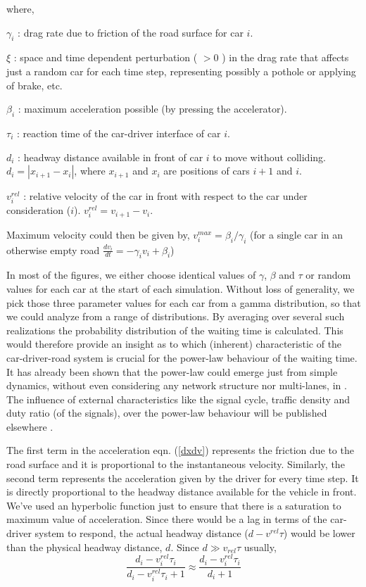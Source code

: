 \documentclass[conference]{IEEEtran}
\begin{document}
where,


$\gamma_{i}$ : drag rate due to friction of the road surface for car $i$.

$\xi$ : space and time dependent perturbation ( $>0$ ) in the drag rate that affects just a random car for each time step, representing possibly a pothole or applying of brake, etc.

$\beta_{i}$ : maximum acceleration possible (by pressing %
the accelerator).

$\tau_{i}$ : reaction time of the car-driver interface of car $i$.

$d_{i}$ : headway distance available in front of car $i$ to move without colliding. $d_{i}=|x_{i+1}-x_{i}|$, where $x_{i+1}$ and $x_{i}$ are positions of cars $i+1$ and $i$.

$v^{rel}_{i}$ : relative velocity of the car in front with respect to the car under consideration ($i$). $v^{rel}_{i}=v_{i+1}-v_{i}$.

Maximum velocity could then be given by, $v^{max}_{i}=\beta_{i}/\gamma_{i}$ (for a single car in an otherwise empty road $\frac{dv_{i}}{dt}=-\gamma_{i} v_{i} + \beta_{i}$)

In most of the figures, we either choose identical values of $\gamma$, $\beta$ and $\tau$ or random values for each car at the start of each simulation.%
Without loss of generality, we pick those three parameter values for each car from a gamma distribution, so that we could analyze from a range of distributions. By averaging over several such realizations the probability distribution of the waiting time is calculated. This would therefore provide an insight as to which (inherent) characteristic of the car-driver-road system is crucial for the power-law behaviour of the waiting time. It has already been shown that the power-law could emerge just from simple dynamics, without even considering any network structure nor multi-lanes, in \cite{Majith2016}. The influence of external characteristics like the signal cycle, traffic density and duty ratio (of the signals), over the power-law behaviour will be published elsewhere \cite{PRL}.

The first term in the acceleration eqn. (\ref{dxdv}) represents the friction due to the road surface and it is proportional to the instantaneous velocity. Similarly, the second term represents the acceleration given by the driver for every time step. It is directly proportional to the headway distance available for the vehicle in front. We've used an hyperbolic function just to ensure that there is a saturation to maximum value of acceleration. Since there would be a lag in terms of the car-driver system to respond, the actual headway distance ($d-v^{rel}\tau$) would be lower than the physical headway distance, $d$. Since $d\gg v_{rel}\tau$ usually,
\[\frac{d_{i}-v^{rel}_{i}\tau_{i}}{d_{i}-v^{rel}_{i}\tau_{i}+1}\approx \frac{d_{i}-v^{rel}_{i}\tau_{i}}{d_{i}+1}\]
\end{document}
